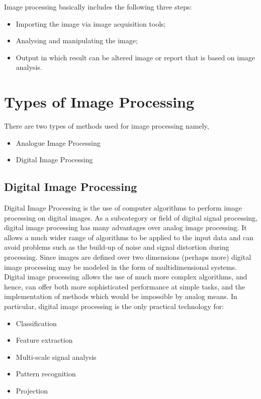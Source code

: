 \documentclass{article}
\begin{document}
\begin{multicols}{2}
        Image processing basically includes the following three steps:
        \begin{itemize}
            \item Importing the image via image acquisition tools;
            \item Analysing and manipulating the image;
            \item Output in which result can be altered image or report that is based on image analysis.
        \end{itemize}    

        \section{Types of Image Processing\cite{sisu}}
            There are two types of methods used for image processing namely, 
            \begin{itemize}
                \item Analogue Image Processing
                \item Digital Image Processing
            \end{itemize}
            \subsection{Digital Image Processing}
                Digital Image Processing is the use of computer algorithms to 
                perform image processing on digital images. As a subcategory or 
                field of digital signal processing, 
                digital image processing has many advantages over analog image 
                processing. It allows a much wider range of algorithms to be 
                applied to the input data and can avoid problems such as the 
                build-up of noise and signal distortion during processing. Since 
                images are defined over two dimensions (perhaps more) digital 
                image processing may be modeled in the form of multidimensional systems. 
                Digital image processing allows the use of much more complex 
                algorithms, and hence, can offer both more sophisticated 
                performance at simple tasks, and the implementation of methods 
                which would be impossible by analog means. \newline
                In particular, digital image processing is the only practical 
                technology for: \newline
                \begin{itemize}
                    \item Classification
                    \item Feature extraction
                    \item Multi-scale signal analysis
                    \item  Pattern recognition
                    \item Projection
                \end{itemize}

\end{multicols}
\end{document}
